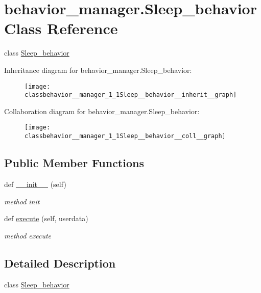 \hypertarget{classbehavior__manager_1_1Sleep__behavior}{}\section{behavior\+\_\+manager.\+Sleep\+\_\+behavior Class Reference}
\label{classbehavior__manager_1_1Sleep__behavior}


class \hyperlink{classbehavior__manager_1_1Sleep__behavior}{Sleep\+\_\+behavior}  




Inheritance diagram for behavior\+\_\+manager.\+Sleep\+\_\+behavior\+:\nopagebreak
\begin{figure}[H]
\begin{center}
\leavevmode
\texttt{[image: classbehavior\_\_manager\_1\_1Sleep\_\_behavior\_\_inherit\_\_graph]}
\end{center}
\end{figure}


Collaboration diagram for behavior\+\_\+manager.\+Sleep\+\_\+behavior\+:\nopagebreak
\begin{figure}[H]
\begin{center}
\leavevmode
\texttt{[image: classbehavior\_\_manager\_1\_1Sleep\_\_behavior\_\_coll\_\_graph]}
\end{center}
\end{figure}
\subsection*{Public Member Functions}
\begin{DoxyCompactItemize}
\item 
def \hyperlink{classbehavior__manager_1_1Sleep__behavior_a778df3c5a36999ef4792e6ac444bd7f3}{\+\_\+\+\_\+init\+\_\+\+\_\+} (self)
\begin{DoxyCompactList}\small\item\em method init \end{DoxyCompactList}\item 
def \hyperlink{classbehavior__manager_1_1Sleep__behavior_a02d87859cb76d2dbdf78d9d6e2452782}{execute} (self, userdata)
\begin{DoxyCompactList}\small\item\em method execute \end{DoxyCompactList}\end{DoxyCompactItemize}


\subsection{Detailed Description}
class \hyperlink{classbehavior__manager_1_1Sleep__behavior}{Sleep\+\_\+behavior} 

